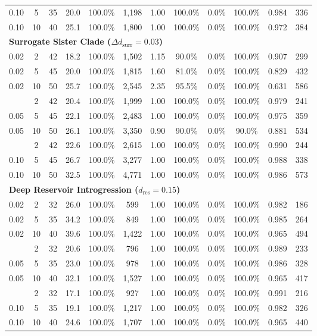\begin{table}[t]
\begin{tabular*}{\textwidth}{@{\extracolsep{\fill}} ccc ccc cccccc @{}}
0.10 &  5 & 35 & 20.0 & 100.0\% & 1,198 & 1.00 & 100.0\% &  0.0\% & 100.0\% & 0.984 &  336 \\
0.10 & 10 & 40 & 25.1 & 100.0\% & 1,800 & 1.00 & 100.0\% &  0.0\% & 100.0\% & 0.972 &  384 \\
\midrule
\multicolumn{12}{l}{\textbf{Surrogate Sister Clade ($\Delta d_{\text{surr}} = 0.03$)}} \\
0.02 &  2 & 42 & 18.2 & 100.0\% & 1,502 & 1.15 & 90.0\% &  0.0\% & 100.0\% & 0.907 &  299 \\
0.02 &  5 & 45 & 20.0 & 100.0\% & 1,815 & 1.60 & 81.0\% &  0.0\% & 100.0\% & 0.829 &  432 \\
0.02 & 10 & 50 & 25.7 & 100.0\% & 2,545 & 2.35 & 95.5\% &  0.0\% & 100.0\% & 0.631 &  586 \\
\addlinespace
0.05 &  2 & 42 & 20.4 & 100.0\% & 1,999 & 1.00 & 100.0\% &  0.0\% & 100.0\% & 0.979 &  241 \\
0.05 &  5 & 45 & 22.1 & 100.0\% & 2,483 & 1.00 & 100.0\% &  0.0\% & 100.0\% & 0.975 &  359 \\
0.05 & 10 & 50 & 26.1 & 100.0\% & 3,350 & 0.90 & 90.0\% &  0.0\% & 90.0\% & 0.881 &  534 \\
\addlinespace
0.10 &  2 & 42 & 22.6 & 100.0\% & 2,615 & 1.00 & 100.0\% &  0.0\% & 100.0\% & 0.990 &  244 \\
0.10 &  5 & 45 & 26.7 & 100.0\% & 3,277 & 1.00 & 100.0\% &  0.0\% & 100.0\% & 0.988 &  338 \\
0.10 & 10 & 50 & 32.5 & 100.0\% & 4,771 & 1.00 & 100.0\% &  0.0\% & 100.0\% & 0.986 &  573 \\
\midrule
\multicolumn{12}{l}{\textbf{Deep Reservoir Introgression ($d_{\text{res}} = 0.15$)}} \\
0.02 &  2 & 32 & 26.0 & 100.0\% &   599 & 1.00 & 100.0\% &  0.0\% & 100.0\% & 0.982 &  186 \\
0.02 &  5 & 35 & 34.2 & 100.0\% &   849 & 1.00 & 100.0\% &  0.0\% & 100.0\% & 0.985 &  264 \\
0.02 & 10 & 40 & 39.6 & 100.0\% & 1,422 & 1.00 & 100.0\% &  0.0\% & 100.0\% & 0.965 &  494 \\
\addlinespace
0.05 &  2 & 32 & 20.6 & 100.0\% &   796 & 1.00 & 100.0\% &  0.0\% & 100.0\% & 0.989 &  233 \\
0.05 &  5 & 35 & 23.0 & 100.0\% &   978 & 1.00 & 100.0\% &  0.0\% & 100.0\% & 0.986 &  328 \\
0.05 & 10 & 40 & 32.1 & 100.0\% & 1,527 & 1.00 & 100.0\% &  0.0\% & 100.0\% & 0.965 &  417 \\
\addlinespace
0.10 &  2 & 32 & 17.1 & 100.0\% &   927 & 1.00 & 100.0\% &  0.0\% & 100.0\% & 0.991 &  216 \\
0.10 &  5 & 35 & 19.1 & 100.0\% & 1,217 & 1.00 & 100.0\% &  0.0\% & 100.0\% & 0.982 &  326 \\
0.10 & 10 & 40 & 24.6 & 100.0\% & 1,707 & 1.00 & 100.0\% &  0.0\% & 100.0\% & 0.965 &  440 \\
\bottomrule
\end{tabular*}
\end{table}

